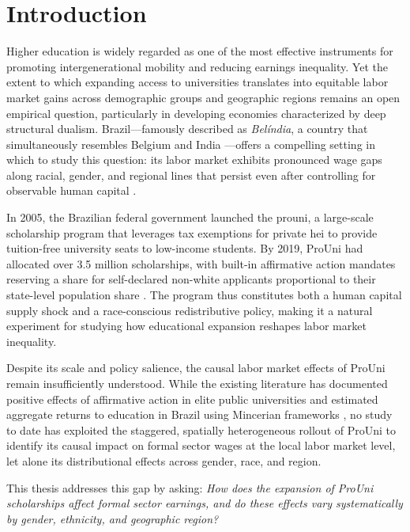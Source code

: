 \clearpage
\section{Introduction}
\label{sec:Intro}

Higher education is widely regarded as one of the most effective instruments for promoting intergenerational mobility and reducing earnings inequality. Yet the extent to which expanding access to universities translates into equitable labor market gains across demographic groups and geographic regions remains an open empirical question, particularly in developing economies characterized by deep structural dualism. Brazil---famously described as \emph{Belíndia}, a country that simultaneously resembles Belgium and India \cite{bacha1976}---offers a compelling setting in which to study this question: its labor market exhibits pronounced wage gaps along racial, gender, and regional lines that persist even after controlling for observable human capital \cite{AriasYamadaTejerina2002, Telles2004, deoliveira2021}.

In 2005, the Brazilian federal government launched the \acrfull{prouni}, a large-scale scholarship program that leverages tax exemptions for private \acrfull{hei} to provide tuition-free university seats to low-income students. By 2019, ProUni had allocated over 3.5 million scholarships, with built-in affirmative action mandates reserving a share for self-declared non-white applicants proportional to their state-level population share \cite{MEC2024}. The program thus constitutes both a human capital supply shock and a race-conscious redistributive policy, making it a natural experiment for studying how educational expansion reshapes labor market inequality.

Despite its scale and policy salience, the causal labor market effects of ProUni remain insufficiently understood. While the existing literature has documented positive effects of affirmative action in elite public universities \cite{RiehlMachadoReyes2023} and estimated aggregate returns to education in Brazil using Mincerian frameworks \cite{Card1999, Mincer1974}, no study to date has exploited the staggered, spatially heterogeneous rollout of ProUni to identify its causal impact on formal sector wages at the local labor market level, let alone its distributional effects across gender, race, and region.

This thesis addresses this gap by asking: \emph{How does the expansion of ProUni scholarships affect formal sector earnings, and do these effects vary systematically by gender, ethnicity, and geographic region?}

